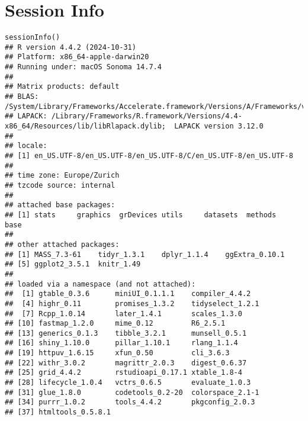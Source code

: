 
\section{Session Info}



\begin{scriptsize}
\begin{knitrout}
\color{fgcolor}\begin{kframe}
\begin{verbatim}
sessionInfo()
## R version 4.4.2 (2024-10-31)
## Platform: x86_64-apple-darwin20
## Running under: macOS Sonoma 14.7.4
## 
## Matrix products: default
## BLAS:   /System/Library/Frameworks/Accelerate.framework/Versions/A/Frameworks/vecLib.framework/Versions/A/libBLAS.dylib 
## LAPACK: /Library/Frameworks/R.framework/Versions/4.4-x86_64/Resources/lib/libRlapack.dylib;  LAPACK version 3.12.0
## 
## locale:
## [1] en_US.UTF-8/en_US.UTF-8/en_US.UTF-8/C/en_US.UTF-8/en_US.UTF-8
## 
## time zone: Europe/Zurich
## tzcode source: internal
## 
## attached base packages:
## [1] stats     graphics  grDevices utils     datasets  methods   base     
## 
## other attached packages:
## [1] MASS_7.3-61    tidyr_1.3.1    dplyr_1.1.4    ggExtra_0.10.1
## [5] ggplot2_3.5.1  knitr_1.49    
## 
## loaded via a namespace (and not attached):
##  [1] gtable_0.3.6      miniUI_0.1.1.1    compiler_4.4.2   
##  [4] highr_0.11        promises_1.3.2    tidyselect_1.2.1 
##  [7] Rcpp_1.0.14       later_1.4.1       scales_1.3.0     
## [10] fastmap_1.2.0     mime_0.12         R6_2.5.1         
## [13] generics_0.1.3    tibble_3.2.1      munsell_0.5.1    
## [16] shiny_1.10.0      pillar_1.10.1     rlang_1.1.4      
## [19] httpuv_1.6.15     xfun_0.50         cli_3.6.3        
## [22] withr_3.0.2       magrittr_2.0.3    digest_0.6.37    
## [25] grid_4.4.2        rstudioapi_0.17.1 xtable_1.8-4     
## [28] lifecycle_1.0.4   vctrs_0.6.5       evaluate_1.0.3   
## [31] glue_1.8.0        codetools_0.2-20  colorspace_2.1-1 
## [34] purrr_1.0.2       tools_4.4.2       pkgconfig_2.0.3  
## [37] htmltools_0.5.8.1
\end{verbatim}
\end{kframe}
\end{knitrout}
\end{scriptsize}



